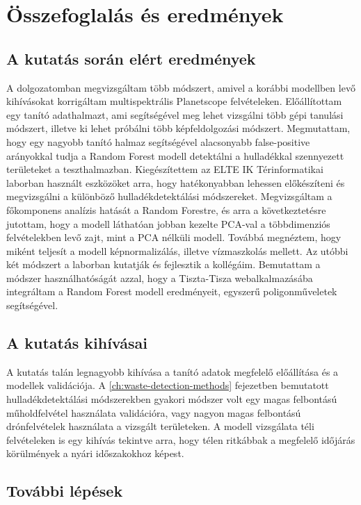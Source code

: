 \chapter{Összefoglalás és eredmények}
\label{ch:sum}

\section{A kutatás során elért eredmények}

A dolgozatomban megvizsgáltam több módszert, amivel a korábbi modellben levő kihívásokat korrigáltam multispektrális Planetscope felvételeken. Előállítottam egy tanító adathalmazt, ami segítségével meg lehet vizsgálni több gépi tanulási módszert, illetve ki lehet próbálni több képfeldolgozási módszert. Megmutattam, hogy egy nagyobb tanító halmaz segítségével alacsonyabb false-positive arányokkal tudja a Random Forest modell detektálni a hulladékkal szennyezett területeket a teszthalmazban. Kiegészítettem az ELTE IK Térinformatikai laborban használt eszközöket arra, hogy hatékonyabban lehessen előkészíteni és megvizsgálni a különböző hulladékdetektálási módszereket. Megvizsgáltam a főkomponens analízis hatását a Random Forestre, és arra a következtetésre jutottam, hogy a modell láthatóan jobban kezelte PCA-val a többdimenziós felvételekben levő zajt, mint a PCA nélküli modell. Továbbá megnéztem, hogy miként teljesít a modell képnormalizálás, illetve vízmaszkolás mellett. Az utóbbi két módszert a laborban kutatják és fejlesztik a kollégáim. Bemutattam a módszer használhatóságát azzal, hogy a Tiszta-Tisza webalkalmazásába integráltam a Random Forest modell eredményeit, egyszerű poligonműveletek segítségével.

\section{A kutatás kihívásai}

A kutatás talán legnagyobb kihívása a tanító adatok megfelelő előállítása és a modellek validációja. A \ref{ch:waste-detection-methods} fejezetben bemutatott hulladékdetektálási módszerekben gyakori módszer volt egy magas felbontású műholdfelvétel használata validációra, vagy nagyon magas felbontású drónfelvételek használata a vizsgált területeken. A modell vizsgálata téli felvételeken is egy kihívás tekintve arra, hogy télen ritkábbak a megfelelő időjárás körülmények a nyári időszakokhoz képest. 

\section{További lépések}

